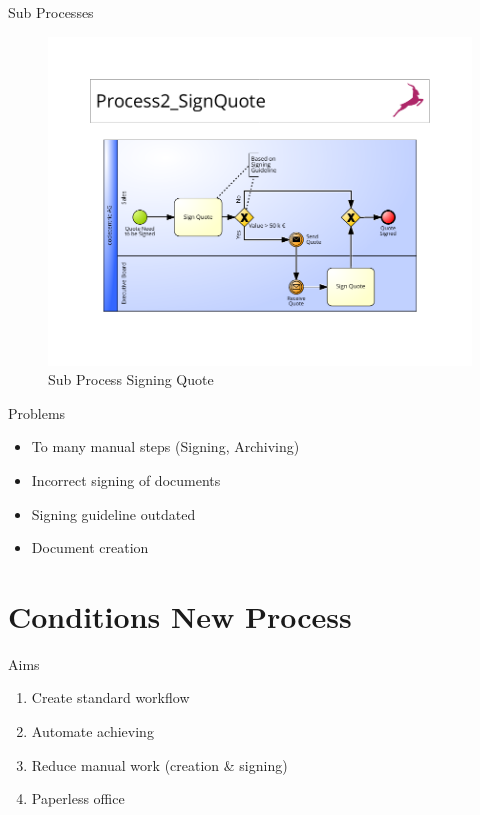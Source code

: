 \documentclass[utf8, xcolor, usenames,dvipsnames, aspectratio=169]{beamer}
\begin{document}
\begin{frame}{Sub Processes}
	\begin{figure}[t]
		\centering
		\includegraphics[height=0.9\textheight]{./images/0-2_signQuote}
		\caption{Sub Process Signing Quote}
	\end{figure}
\end{frame}

\begin{frame}{Problems}
	\begin{itemize}
		\item To many manual steps (Signing, Archiving)		
		\item Incorrect signing of documents 
		\item Signing guideline outdated
		\item Document creation
	\end{itemize}
\end{frame}

\section{Conditions New Process}
\begin{frame}{Aims}
	\begin{enumerate}
		\item Create standard workflow
		\item Automate achieving
		\item Reduce manual work (creation \& signing)
		\item Paperless office
	\end{enumerate}
\end{frame}
\end{document}
